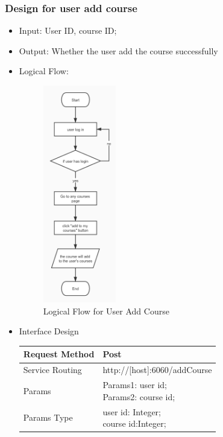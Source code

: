 \documentclass[16pt]{scrreprt}
\begin{document}
\subsubsection{Design for user add course}
\begin{itemize}
    \item Input: User ID, course ID; 
    \item Output: Whether the user add the course successfully
    \item Logical Flow:
     \begin{figure}[H]
    \centering
    \includegraphics[width=0.3\textwidth]{diagrams/user-add-course.jpg}
    \caption{Logical Flow for User Add Course}
\end{figure}
    \item Interface Design
    \begin{center}
    \begin{tabular}{p{5cm}p{10cm}}
        \hline
        Request Method & Post\\
        \hline
        Service Routing &  http://[host]:6060/addCourse\\
        \hline
        Params & \makecell[l]{Params1: user id;\\ Params2: course id;}\\ 
        \hline
        Params Type & \makecell[l]{user id: Integer;\\course id:Integer;}\\
        \hline

\end{tabular}
\end{center}
\end{itemize}
\end{document}
